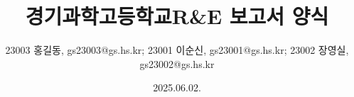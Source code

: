 \title{경기과학고등학교\linebreak R\&E 보고서 양식}
\author{23003 홍길동, gs23003@gs.hs.kr; 23001 이순신, gs23001@gs.hs.kr; 23002 장영실, gs23002@gs.hs.kr}
\date{2025.06.02.}

